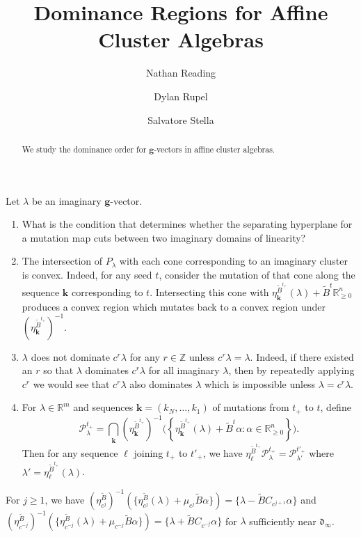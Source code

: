 \documentclass{amsart}
\title{Dominance Regions for Affine Cluster Algebras}
\author{Nathan Reading}
\author{Dylan Rupel}
\author{Salvatore Stella}
\numberwithin{theorem}{section}
\newcommand{\bfg}{{\boldsymbol{g}}}
\newcommand{\bfk}{{\boldsymbol{k}}}
\newcommand{\bfl}{{\boldsymbol{\ell}}}
\newcommand{\cP}{\mathcal{P}}
\newcommand{\fd}{\mathfrak{d}}
\newcommand{\RR}{\mathbb{R}}
\newcommand{\ZZ}{\mathbb{Z}}
\begin{document}
  \begin{abstract}
    We study the dominance order for $\bfg$-vectors in affine cluster algebras.
  \end{abstract}
  \maketitle

  Let $\lambda$ be an imaginary $\bfg$-vector.
  \begin{enumerate}
    \item What is the condition that determines whether the separating hyperplane for a mutation map cuts between two imaginary domains of linearity?
    \item The intersection of $P_\lambda$ with each cone corresponding to an imaginary cluster is convex.
      Indeed, for any seed $t$, consider the mutation of that cone along the sequence $\bfk$ corresponding to $t$.
      Intersecting this cone with $\eta^{\widetilde B^{t_+}}_\bfk(\lambda)+\widetilde B^t \RR_{\ge0}^n$ produces a convex region which mutates back to a convex region under $\left(\eta^{\widetilde B^{t_+}}_\bfk\right)^{-1}$.
    \item $\lambda$ does not dominate $c^r\lambda$ for any $r\in\ZZ$ unless $c^r\lambda=\lambda$.
      Indeed, if there existed an $r$ so that $\lambda$ dominates $c^r\lambda$ for all imaginary $\lambda$, then by repeatedly applying $c^r$ we would see that $c^r\lambda$ also dominates $\lambda$ which is impossible unless $\lambda=c^r\lambda$.
    \item For $\lambda\in\RR^m$ and sequences $\bfk=(k_N,\ldots,k_1)$ of mutations from $t_+$ to $t$, define 
      \[
        \cP^{t_+}_\lambda = \bigcap_\bfk \left(\eta^{\widetilde B^{t_+}}_\bfk\right)^{-1}\big(\left\{\eta^{\widetilde B^{t_+}}_\bfk(\lambda)+\widetilde B^t\alpha:\alpha\in\RR^n_{\ge0}\right\}\big).
      \]
      Then for any sequence $\bfl$ joining $t_+$ to $t'_+$, we have $\eta^{\widetilde B^{t_+}}_\bfl \cP^{t_+}_\lambda=\cP^{t'_+}_{\lambda'}$ where $\lambda'=\eta^{\widetilde B^{t_+}}_\bfl(\lambda)$.
  \end{enumerate}

  For $j\ge 1$, we have $(\eta_{c^j}^{\widetilde B})^{-1}\left(\{\eta_{c^j}^{\widetilde B}(\lambda)+\mu_{c^j}\widetilde B \alpha\}\right) = \{\lambda - \widetilde B C_{c^{j+1}} \alpha \}$ and $(\eta_{c^{-j}}^{\widetilde B})^{-1}\left(\{\eta_{c^{-j}}^{\widetilde B}(\lambda)+\mu_{c^{-j}}\widetilde B \alpha\}\right) = \{\lambda + \widetilde B C_{c^{-j}} \alpha \}$ for $\lambda$ sufficiently near $\fd_\infty$.
\end{document}
